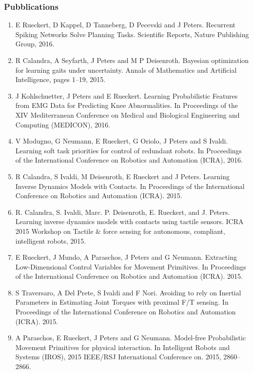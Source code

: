 \subsubsection{Pubblications}

\begin{enumerate}
\item E Rueckert, D Kappel, D Tanneberg, D Pecevski and J Peters. Recurrent Spiking Networks Solve Planning Tasks. Scientific Reports, Nature Publishing Group, 2016.
\item R Calandra, A Seyfarth, J Peters and M P Deisenroth. Bayesian optimization for learning gaits under uncertainty. Annals of Mathematics and Artificial Intelligence, pages 1–19, 2015.
\item J Kohlschuetter, J Peters and E Rueckert. Learning Probabilistic Features from EMG Data for Predicting Knee Abnormalities. In Proceedings of the XIV Mediterranean Conference on Medical and Biological Engineering and Computing (MEDICON), 2016.
\item V Modugno, G Neumann, E Rueckert, G Oriolo, J Peters and S Ivaldi. Learning soft task priorities for control of redundant robots. In Proceedings of the International Conference on Robotics and Automation (ICRA), 2016.
\item R Calandra, S Ivaldi, M Deisenroth, E Rueckert and J Peters. Learning Inverse Dynamics Models with Contacts. In Proceedings of the International Conference on Robotics and Automation (ICRA). 2015.
\item R. Calandra, S. Ivaldi, Marc. P. Deisenroth, E. Rueckert, and J. Peters. Learning inverse dynamics models with contacts using tactile sensors. ICRA 2015 Workshop on Tactile \& force sensing for autonomous, compliant, intelligent robots, 2015.
\item E Rueckert, J Mundo, A Paraschos, J Peters and G Neumann. Extracting Low-Dimensional Control Variables for Movement Primitives. In Proceedings of the International Conference on Robotics and Automation (ICRA). 2015. 
\item S Traversaro, A Del Prete, S Ivaldi and F Nori. Avoiding to rely on Inertial Parameters in Estimating Joint Torques with proximal F/T sensing. In Proceedings of the International Conference on Robotics and Automation (ICRA). 2015.
\item A Paraschos, E Rueckert, J Peters and G Neumann. Model-free Probabilistic Movement Primitives for physical interaction. In Intelligent Robots and Systems (IROS), 2015 IEEE/RSJ International Conference on. 2015, 2860–2866. 

\end{enumerate}
